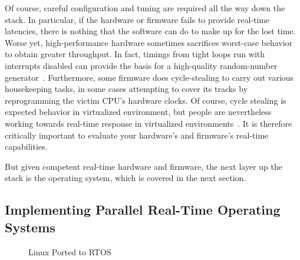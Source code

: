 Of course, careful configuration and tuning are required all the way down
the stack.
In particular, if the hardware or firmware fails to provide real-time
latencies, there is nothing that the software can do to make up for the
lost time.
Worse yet, high-performance hardware sometimes sacrifices worst-case behavior
to obtain greater throughput.
In fact, timings from tight loops run with interrupts disabled can
provide the basis for a high-quality random-number
generator~\cite{PeterOkech2009InherentRandomness}.
Furthermore, some firmware does cycle-stealing to carry out various
housekeeping tasks, in some cases attempting to cover its tracks by
reprogramming the victim CPU's hardware clocks.
Of course, cycle stealing is expected behavior in virtualized
environment, but people are nevertheless working towards real-time
response in virtualized
environments~\cite{ThomasGleixner2012KVMrealtime,JanKiszka2014virtRT}.
It is therefore critically important to evaluate your hardware's and
firmware's real-time capabilities.

But given competent real-time hardware and firmware, the next
layer up the stack is the operating system, which is covered in
the next section.

\subsection{Implementing Parallel Real-Time Operating Systems}
\label{sec:advsync:Implementing Parallel Real-Time Operating Systems}

\begin{figure}
\centering
{}
\caption{Linux Ported to RTOS}
\label{fig:advsync:Linux Ported to RTOS}
\end{figure}


